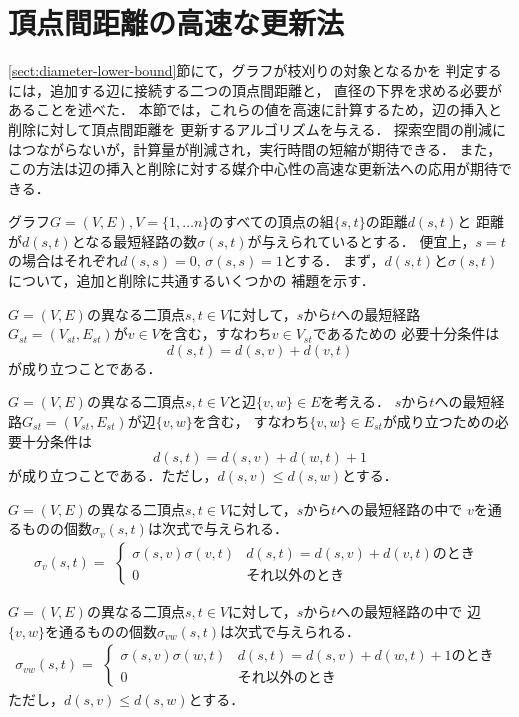 \section{頂点間距離の高速な更新法}
\label{sect:fast-distance-update}
\ref{sect:diameter-lower-bound}節にて，グラフが枝刈りの対象となるかを
判定するには，追加する辺に接続する二つの頂点間距離と，
直径の下界を求める必要があることを述べた．
本節では，これらの値を高速に計算するため，辺の挿入と削除に対して頂点間距離を
更新するアルゴリズムを与える．
探索空間の削減にはつながらないが，計算量が削減され，実行時間の短縮が期待できる．
また，この方法は辺の挿入と削除に対する媒介中心性の高速な更新法への応用が期待できる．

グラフ$G=(V,E),V=\{1,\ldots n\}$のすべての頂点の組$\{s,t\}$の距離$d(s,t)$と
距離が$d(s,t)$となる最短経路の数$\sigma(s,t)$が与えられているとする．
便宜上，$s=t$の場合はそれぞれ$d(s,s)=0,\,\sigma(s,s)=1$とする．
まず，$d(s,t)$と$\sigma(s,t)$について，追加と削除に共通するいくつかの
補題を示す．
\begin{lemma-without-proof}
  \label{lemma:distance-1}
  $G=(V,E)$の異なる二頂点$s,t\in V$に対して，$s$から$t$への最短経路
  $G_{st}=(V_{st},E_{st})$が$v\in V$を含む，すなわち$v\in V_{st}$であるための
  必要十分条件は
  \[ d(s,t)=d(s,v)+d(v,t) \]
  が成り立つことである．
\end{lemma-without-proof}
\begin{lemma-without-proof}
  \label{lemma:distance-2}
  $G=(V,E)$の異なる二頂点$s,t\in V$と辺$\{v,w\}\in E$を考える．
  $s$から$t$への最短経路$G_{st}=(V_{st},E_{st})$が辺$\{v,w\}$を含む，
  すなわち$\{v,w\}\in E_{st}$が成り立つための必要十分条件は
  \[ d(s,t)=d(s,v)+d(w,t)+1 \]
  が成り立つことである．ただし，$d(s,v)\leq d(s,w)$とする．
\end{lemma-without-proof}
\begin{lemma-without-proof}
  \label{lemma:path-num-1}
  $G=(V,E)$の異なる二頂点$s,t\in V$に対して，$s$から$t$への最短経路の中で
  $v$を通るものの個数$\sigma_v(s,t)$は次式で与えられる．
  \[ \sigma_v(s,t)=\begin{aligned}\begin{cases}
    \sigma(s,v)\sigma(v,t) & d(s,t)=d(s,v)+d(v,t)\text{のとき} \\
    0 & \text{それ以外のとき}
  \end{cases}\end{aligned} \]
\end{lemma-without-proof}
\begin{lemma-without-proof}
  \label{lemma:path-num-2}
  $G=(V,E)$の異なる二頂点$s,t\in V$に対して，$s$から$t$への最短経路の中で
  辺$\{v,w\}$を通るものの個数$\sigma_{vw}(s,t)$は次式で与えられる．
  \[ \sigma_{vw}(s,t)=\begin{aligned}\begin{cases}
    \sigma(s,v)\sigma(w,t) & d(s,t)=d(s,v)+d(w,t)+1\text{のとき} \\
    0 & \text{それ以外のとき}
  \end{cases}\end{aligned} \]
  ただし，$d(s,v)\leq d(s,w)$とする．
\end{lemma-without-proof}

